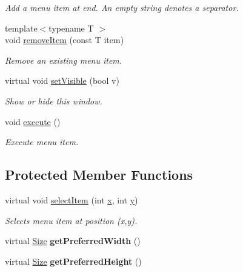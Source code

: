 \begin{DoxyCompactItemize}
\begin{DoxyCompactList}\small\item\em Add a menu item at end. An empty string denotes a separator. \end{DoxyCompactList}\item 
\hypertarget{classGUI_1_1Menu_ae6cd62f5e369c6278dd0d4cdb5228b18}{{\footnotesize template$<$typename T $>$ }\\void \hyperlink{classGUI_1_1Menu_ae6cd62f5e369c6278dd0d4cdb5228b18}{remove\-Item} (const T item)}\label{classGUI_1_1Menu_ae6cd62f5e369c6278dd0d4cdb5228b18}

\begin{DoxyCompactList}\small\item\em Remove an existing menu item. \end{DoxyCompactList}\item 
virtual void \hyperlink{classGUI_1_1Menu_aa98bb7305b74088dd875ead6747cfa52}{set\-Visible} (bool v)
\begin{DoxyCompactList}\small\item\em Show or hide this window. \end{DoxyCompactList}\item 
\hypertarget{classGUI_1_1Menu_a667536e40b0f50577d6c2ed0c655f24d}{void \hyperlink{classGUI_1_1Menu_a667536e40b0f50577d6c2ed0c655f24d}{execute} ()}\label{classGUI_1_1Menu_a667536e40b0f50577d6c2ed0c655f24d}

\begin{DoxyCompactList}\small\item\em Execute menu item. \end{DoxyCompactList}\end{DoxyCompactItemize}
\subsection*{Protected Member Functions}
\begin{DoxyCompactItemize}
\item 
virtual void \hyperlink{classGUI_1_1Menu_a57297fc9ebe558143299d57417c77169}{select\-Item} (int \hyperlink{classGUI_1_1Window_a6ca6a80ca00c9e1d8ceea8d3d99a657d}{x}, int \hyperlink{classGUI_1_1Window_a0ee8e923aff2c3661fc2e17656d37adf}{y})
\begin{DoxyCompactList}\small\item\em Selects menu item at position (x,y). \end{DoxyCompactList}\item 
\hypertarget{classGUI_1_1Menu_a4ac59a2d2ba412a7da05dd8d7dbb488d}{virtual \hyperlink{namespaceGUI_a10b6232e08729baa0bd211a86a69ce36}{Size} {\bfseries get\-Preferred\-Width} ()}\label{classGUI_1_1Menu_a4ac59a2d2ba412a7da05dd8d7dbb488d}

\item 
\hypertarget{classGUI_1_1Menu_a0f2554a3f47b7b7f3ba9c2b874a7b250}{virtual \hyperlink{namespaceGUI_a10b6232e08729baa0bd211a86a69ce36}{Size} {\bfseries get\-Preferred\-Height} ()}\label{classGUI_1_1Menu_a0f2554a3f47b7b7f3ba9c2b874a7b250}

\end{DoxyCompactItemize}
